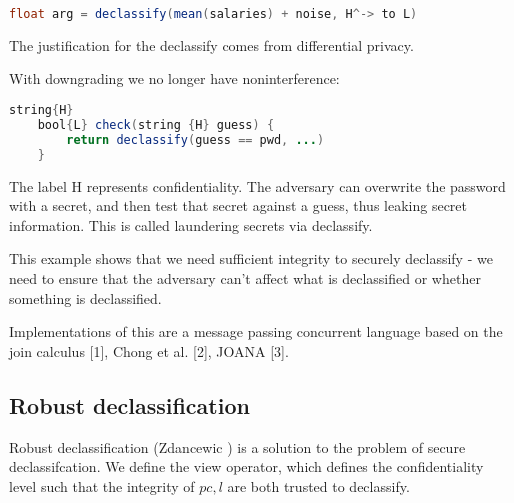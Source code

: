 \documentclass{article}
\begin{document}
\begin{lstlisting}[language=Java]
    float arg = declassify(mean(salaries) + noise, H^-> to L)
\end{lstlisting}

The justification for the declassify comes from differential privacy.

With downgrading we no longer have noninterference:

\begin{lstlisting}[language=Java]
    string{H} 
    bool{L} check(string {H} guess) {
        return declassify(guess == pwd, ...)
    }
\end{lstlisting}

The label H represents confidentiality. The adversary can overwrite the password with a secret, and then test that secret against a guess, thus leaking secret information. This is called laundering secrets via declassify.

This example shows that we need sufficient integrity to securely declassify - we need to ensure that the adversary can't affect what is declassified or whether something is declassified.

Implementations of this are a message passing concurrent language based on the join calculus [1], Chong et al. [2], JOANA [3].
\cite{zdancewic2003observational}

\subsection*{Robust declassification}

Robust declassification (Zdancewic \cite{zdancewic2001robust}) is a solution to the problem of secure declassifcation.
We define the view operator, which defines the confidentiality level such that the integrity of $pc, l$ are both trusted to declassify. 
\end{document}
